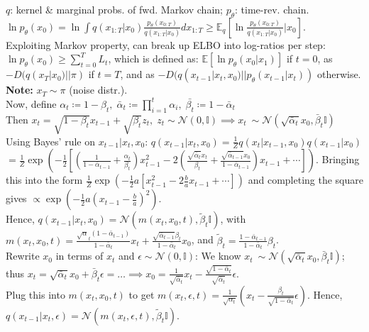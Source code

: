 $q$: kernel \& marginal probs. of fwd. Markov chain; $p_\theta$: time-rev. chain.\\
\textrightarrow $\ln p_\theta(x_0)=\ln\int q(x_{1:T}|x_0)\frac{p_\theta(x_{0:T})}{q(x_{1:T}|x_0)}dx_{1:T} \geq \mathbb{E}_q[\ln\frac{p_\theta(x_{0:T})}{q(x_{1:T}|x_0)}|x_0]$. \\
Exploiting Markov property, can break up ELBO into log-ratios per step: \\
$\ln p_\theta(x_0)\geq \sum_{t=0}^TL_t$, which is defined as: $\mathbb{E}[\ln p_\theta(x_0|x_1)]$ if $t=0$, as $-D(q(x_T|x_0)||\pi)$ if $t=T$, and as $-D(q(x_{t-1}|x_t, x_0)||p_\theta(x_{t-1}|x_t))$ otherwise. \textbf{Note:} $x_T \sim \pi$ (noise distr.). \\
Now, define $\alpha_t \coloneqq 1-\beta_t, \; \bar{\alpha}_t\coloneqq \prod_{i=1}^t\alpha_i, \; \bar{\beta_t}\coloneqq1-\bar{\alpha}_t$ \\
Then $x_t=\sqrt{1-\beta_t}x_{t-1}+\sqrt{\beta_t}z_t, \; z_t\sim\mathcal{N}(0,\mathbb{I}) \implies x_t ~\sim\mathcal{N}(\sqrt{\bar{\alpha}_t}x_0, \bar{\beta}_t\mathbb{I})$\\
Using Bayes' rule on $x_{t-1}|x_t,x_0$: $q(x_{t-1}|x_t, x_0)=\frac{1}{Z}q(x_t|x_{t-1},x_0)q(x_{t-1}|x_0)$ $=\frac{1}{Z}\exp\left(-\frac{1}{2} \left[\left(\frac{1}{1-\bar{\alpha}_{t-1}}+\frac{\alpha_t}{\beta_t}\right)x_{t-1}^2-2\left(\frac{\sqrt{\bar{\alpha}_{t}}x_t}{\beta_t}+\frac{{\sqrt{\bar{\alpha}_{t-1}}x_0}}{1-\bar{\alpha}_{t-1}}\right)x_{t-1}+\cdots\right]  \right)$. Bringing this into the form $\frac{1}{Z}\exp\left( -\frac{1}{2}a\left[ x_{t-1}^2 - 2\frac{b}{a}x_{t-1}+\cdots \right] \right)$ and completing the square gives $\propto \exp\left( -\frac{1}{2}a\left(x_{t-1} - \frac{b}{a} \right)^2 \right)$.\\
Hence, $q(x_{t-1}|x_t,x_0)=\mathcal{N}(m(x_t,x_0,t),\tilde{\beta}_t\mathbb{I})$, with $m(x_t,x_0,t)=\frac{\sqrt{\alpha}_t(1-\bar{\alpha}_{t-1})}{1-\bar{\alpha}_t}x_t+\frac{\sqrt{\bar{\alpha}_{t-1}}\beta_t}{1-\bar{\alpha}_t}x_0$, and $\tilde{\beta}_t=\frac{1-\bar{\alpha}_{t-1}}{1-\bar{\alpha}_t}\beta_t$.\\
Rewrite $x_0$ in terms of $x_t$ and $\epsilon \sim \mathcal{N}(0, \mathbb{I})$: We know $x_t ~\sim\mathcal{N}(\sqrt{\bar{\alpha}_t}x_0, \bar{\beta}_t\mathbb{I})$; thus $x_t=\sqrt{\bar{\alpha}_t}x_0+\bar{\beta}_t\epsilon=\dots\implies x_0=\frac{1}{\sqrt{\bar{\alpha}_t}}x_t - \frac{\sqrt{1-\bar{\alpha}_t}}{\sqrt{\bar{\alpha}_t}}\epsilon$. \\
Plug this into $m(x_t,x_0,t)$ to get $m(x_t,\epsilon,t)=\frac{1}{\sqrt{\alpha_t}}(x_t-\frac{\beta_t}{\sqrt{1-\bar{\alpha}_t}}\epsilon)$. Hence, $q(x_{t-1}|x_t, \epsilon)=\mathcal{N}(m(x_t,\epsilon,t), \tilde{\beta}_t\mathbb{I})$.\\
